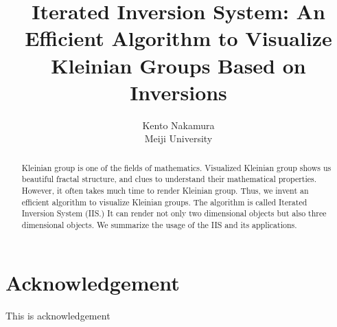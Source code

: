 \documentclass[uplatex, dvipdfmx]{article}
\title{ Iterated Inversion System: An Efficient Algorithm to Visualize Kleinian Groups Based on Inversions }
\author{ Kento Nakamura\\
Meiji University\\
}
\date{}
\begin{document}
\maketitle
\pagestyle{plain}


\begin{abstract}
 Kleinian group is one of the fields of mathematics. Visualized
 Kleinian group shows us beautiful fractal structure, and clues to
 understand their mathematical properties.
 However, it often takes much time to render Kleinian group.
 Thus, we invent an efficient algorithm to visualize Kleinian groups. 
 The algorithm is called Iterated Inversion System
 (IIS.) It can render not only two dimensional objects but also three
 dimensional objects.
 We summarize the usage of the IIS and its applications.
\end{abstract}

\clearpage

\tableofcontents

\clearpage









\section*{Acknowledgement}
This is acknowledgement

\printbibliography
\end{document}
